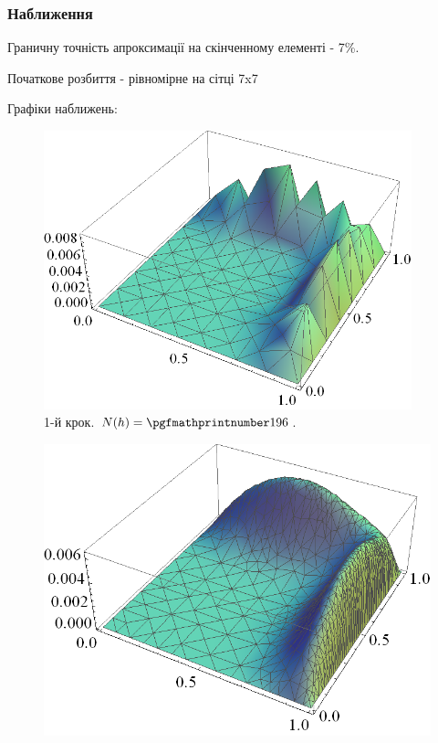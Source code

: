 \begin{frame}[allowframebreaks]
	\frametitle<presentation>{Наближення}

	Граничну точність апроксимації на скінченному елементі - 7\%.

	Початкове розбиття - рівномірне на сітці 7x7

	Графіки наближень:

		\begin{figure}[H]
			 \begin{columns}
			 	\begin{column}{0.5\textwidth}
		     		\includegraphics[width=\textwidth]{problem2/my/solutions/solution1}
		     	\end{column}
		     	\begin{column}{0.3\textwidth}
		     		\caption*{1-й крок. $N(h) = \nn{196}$.}
		     	\end{column}
		     \end{columns}
		\end{figure}
		\begin{figure}[H]
			\begin{columns}
			 	\begin{column}{0.7\textwidth}
			 		\includegraphics[width=\textwidth]{problem2/my/solutions/solution3}

\end{column}
\end{columns}
\end{figure}
\end{frame}
